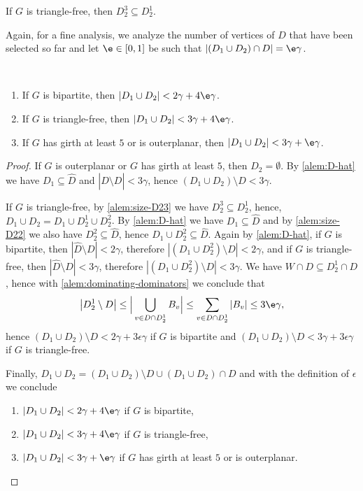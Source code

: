 \begin{alemma}\label{alem:size-D23}
  If $G$ is triangle-free, then $D_2^3\subseteq D_2^1$.
\end{alemma}

Again, for a fine analysis, we
analyze the number of vertices of $D$ that have been selected
so far and let $\e\in [0,1]$ be such that $|(D_1 \cup D_2)\cap D| =\e\gamma$.

\begin{alemma}\label{alem:size-D12}
\mbox{ }
\vspace{-1mm}
\begin{enumerate}
\item If $G$ is bipartite, then $|D_1\cup D_2| < 2\gamma+4\e\gamma$.\smallskip
\item If $G$ is triangle-free, then $|D_1\cup D_2| < 3\gamma+4\e\gamma$.\smallskip
\item If $G$ has girth at least $5$ or is outerplanar, then $|D_1\cup D_2| < 3\gamma+\e\gamma$.
\end{enumerate}
\end{alemma}
\begin{proof}
If $G$ is outerplanar or $G$ has girth at least $5$, then $D_2=\emptyset$.
By \cref{alem:D-hat} we have $D_1\subseteq \hat{D}$ and
$|\hat{D}\setminus D|<3\gamma$, hence $(D_1\cup D_2)\setminus D<3\gamma$.

If $G$ is triangle-free, by \cref{alem:size-D23} we have $D_2^3\subseteq D_2^1$, hence,
  $D_1\cup D_2=D_1\cup D_2^1\cup D_2^2$. By \cref{alem:D-hat} we have
  $D_1 \subseteq \hat D$ and by \cref{alem:size-D22} we also have
  $D_2^2 \subseteq \hat D$, hence $D_1\cup D_2^2\subseteq \hat D$.
  Again by \cref{alem:D-hat}, if $G$ is bipartite, then
  $|\hat D \setminus D|<2\gamma$, therefore $|(D_1 \cup D_2^2 )\setminus D| < 2\gamma$, and if $G$ is triangle-free,
  then $|\hat D \setminus D|<3\gamma$,
  therefore $|(D_1 \cup D_2^2 )\setminus D| < 3\gamma$.
  We have $W\cap D\subseteq D_2^1\cap D$, hence with
  \cref{alem:dominating-dominators} we conclude that
  \[
    \big\vert D_2^1 \setminus D \big\vert \leq
    \Big\vert\bigcup\limits_{v\in D \cap D_2^1}B_v\Big\vert \leq
    \sum\limits_{v\in D \cap D_2^1} |B_v| \leq 3\e\gamma,
  \]
  hence $(D_1\cup D_2)\setminus D<2\gamma+3\epsilon\gamma$ if
  $G$ is bipartite and $(D_1\cup D_2)\setminus D<3\gamma+3\epsilon\gamma$
  if $G$ is triangle-free.

  Finally,
  $D_1\cup D_2=(D_1\cup D_2)\setminus D\cup (D_1\cup D_2)\cap D$ and
  with the definition of $\epsilon$ we conclude

  \vspace{-2mm}
  \begin{enumerate}
  \item $|D_1\cup D_2|<2\gamma + 4\e\gamma$ if $G$ is bipartite, \smallskip
  \item $|D_1\cup D_2|<3\gamma + 4\e\gamma$ if $G$ is triangle-free, \smallskip
  \item $|D_1\cup D_2|<3\gamma + \e\gamma$ if $G$ has girth at least
  $5$ or is outerplanar.
  \end{enumerate}

\end{proof}

